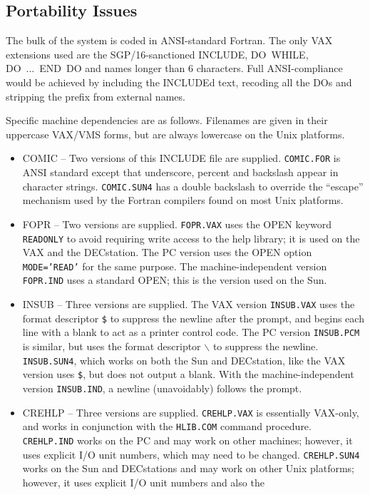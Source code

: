 \subsection{Portability Issues}
The bulk of the system is coded in ANSI-standard Fortran.  The only
VAX extensions used are the SGP/16-sanctioned
INCLUDE, DO~WHILE, DO~...~END~DO and names longer than
6 characters.  Full ANSI-compliance would be achieved by including
the INCLUDEd text, recoding
all the DOs and stripping the prefix  from
external names.

Specific machine dependencies are as follows.  Filenames are given
in their uppercase VAX/VMS forms, but are always lowercase on
the Unix platforms.
\begin{itemize}
\item COMIC -- Two versions of this INCLUDE file are supplied.
{\tt COMIC.FOR} is ANSI standard except that underscore, percent and
backslash appear in character strings.  {\tt COMIC.SUN4} has a double
backslash to override the ``escape'' mechanism used by the Fortran
compilers found on most Unix platforms.
\item FOPR -- Two versions are supplied.  {\tt FOPR.VAX} uses
the OPEN keyword {\tt READONLY} to avoid requiring
write access to the help library;  it is used on the VAX and
the DECstation.  The PC version uses the OPEN option
{\tt MODE='READ'} for the same
purpose.  The machine-independent version {\tt FOPR.IND} uses a
standard OPEN;  this is the version used on the Sun.
\item INSUB -- Three versions are supplied.  The VAX version
{\tt INSUB.VAX} uses
the format descriptor {\tt \$} to suppress the newline after the
prompt, and begins each line with a blank to act as a printer
control code.  The PC version {\tt INSUB.PCM} is similar, but uses the
format descriptor $\backslash$ to suppress the newline.
{\tt INSUB.SUN4}, which works on both the Sun and DECstation,
like the VAX version uses {\tt \$}, but does not output
a blank.
With the machine-independent version {\tt INSUB.IND}, a newline (unavoidably)
follows the prompt.
\item CREHLP -- Three versions are supplied.  {\tt CREHLP.VAX} is essentially
VAX-only, and works in conjunction with the {\tt HLIB.COM} command procedure.
{\tt CREHLP.IND} works on the PC and may work on other machines;  however,
it uses explicit I/O unit numbers, which may need to be changed.
{\tt CREHLP.SUN4} works on the Sun and DECstations and may work on other Unix
platforms;  however, it uses explicit I/O unit numbers and also the

\end{itemize}
